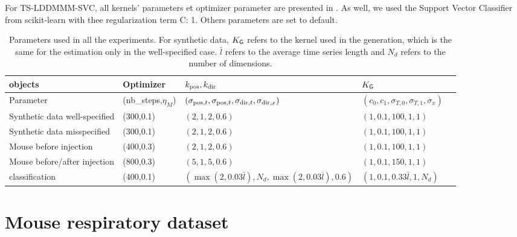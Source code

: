 For TS-LDDMMM-SVC, all kernels' parameters et optimizer parameter are presented in .
As well, we used the Support Vector Classifier from scikit-learn with thee regularization term C: 1. Others parameters are set to default.


 \begin{table}[hbt!]
  \caption{Parameters used in all the experiments.
   For synthetic data, $K_{\mathsf{G}}$ refers to the kernel used in the generation, which is the same for the estimation only in the well-specified case. $\bar{l}$ refers to the average time series length and $N_d$ refers to the number of dimensions.}
  \centering
  \begin{tabular}{lllll}

            \toprule 
            objects & Optimizer &$k_{\mathrm{pos}},k_{\mathrm{dir}}$ & $K_{\mathsf{G}} $ \\
            \midrule
            Parameter & (nb\_steps,$\eta_M$) &$(\sigma_{\mathrm{pos},t}, \sigma_{\mathrm{pos},t}, \sigma_{\mathrm{dir},t}, \sigma_{\mathrm{dir},x})$ & $(c_0,c_1,\sigma_{T,0},\sigma_{T,1},\sigma_x)$ \\
            \midrule
            Synthetic data well-specified &(300,0.1) &$(2,1,2,0.6)$& $(1,0.1,100,1,1)$   \\
            Synthetic data misspecified  & (300,0.1)  & $ (2,1,2,0.6)$ &$(1,0.1,100,1,1)$  \\
            Mouse before injection  & (400,0.3)  & $ (2,1,2,0.6)$ &$(1,0.1,100,1,1)$  \\
            Mouse before/after injection  & (800,0.3)  & $ (5,1,5,0.6)$ &$(1,0.1,150,1,1)$  \\
            classification  & (400,0.1)  & $(\max(2,0.03\bar{l}),N_d,\max(2,0.03\bar{l}),0.6)$  & $(1,0.1,0.33\bar{l},1,N_d)$  \\

            \bottomrule
          \end{tabular}
        \label{appendix:table:set_up_exp_practical}
    \end{table}
\section{Mouse respiratory dataset}

